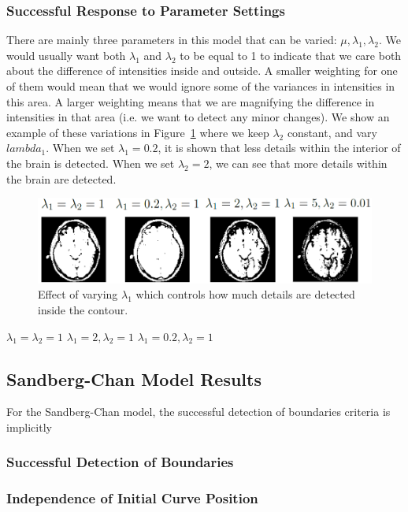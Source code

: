 \documentclass[10pt,journal,letterpaper,compsoc]{IEEEtran}
\begin{document}
\subsubsection*{Successful Response to Parameter Settings}

There are mainly three parameters in this model that can be varied: $\mu, \lambda_{1}, \lambda_{2}$. We would usually want both $\lambda_{1}$ and $\lambda_{2}$
to be equal to 1 to indicate that we care both about the difference of intensities inside and outside. A smaller weighting for one of them would mean that we
would ignore some of the variances in intensities in this area. A larger weighting means that we are magnifying the difference in intensities in that area
(i.e. we want to detect any minor changes). We show an example of these variations in Figure~\ref{fig:cv_eg12} where we keep $\lambda_{2}$ constant, and vary
$lambda_1$. When we set $\lambda_1 = 0.2$, it is shown that less details within the interior of the brain is detected. When we set $\lambda_2 = 2$, we can see
that more details within the brain are detected. 

\begin{figure}[t]
\centering
\includegraphics[width=12cm]{cv_eg12.png}
\caption{Effect of varying $\lambda_1$ which controls how much details are detected inside the contour.}
\label{fig:cv_eg12}
\end{figure}

$\lambda_1 = \lambda_2 = 1$
$\lambda_1 = 2, \lambda_2 = 1$
$\lambda_1 = 0.2, \lambda_2 = 1$ 

\subsection{Sandberg-Chan Model Results}

For the Sandberg-Chan model, the successful detection of boundaries criteria is implicitly 

\subsubsection*{Successful Detection of Boundaries}

\subsubsection*{Independence of Initial Curve Position}
\end{document}
